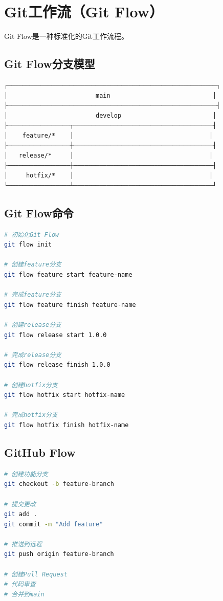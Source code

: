 \documentclass[12pt,UTF8]{ctexbook}
\begin{document}
\section{Git工作流（Git Flow）}
\label{sec:git-workflow}

Git Flow是一种标准化的Git工作流程。

\subsection*{Git Flow分支模型}
\begin{lstlisting}
┌─────────────────────────────────────────────────────────┐
│                        main                            │
├─────────────────────────────────────────────────────────┤
│                        develop                         │
├─────────────────┬──────────────────────────────────────┤
│    feature/*    │                                     │
├─────────────────┼──────────────────────────────────────┤
│   release/*     │                                     │
├─────────────────┼──────────────────────────────────────┤
│     hotfix/*    │                                     │
└─────────────────┴──────────────────────────────────────┘
\end{lstlisting}

\subsection*{Git Flow命令}
\begin{lstlisting}[language=bash]
# 初始化Git Flow
git flow init

# 创建feature分支
git flow feature start feature-name

# 完成feature分支
git flow feature finish feature-name

# 创建release分支
git flow release start 1.0.0

# 完成release分支
git flow release finish 1.0.0

# 创建hotfix分支
git flow hotfix start hotfix-name

# 完成hotfix分支
git flow hotfix finish hotfix-name
\end{lstlisting}

\subsection*{GitHub Flow}
\begin{lstlisting}[language=bash]
# 创建功能分支
git checkout -b feature-branch

# 提交更改
git add .
git commit -m "Add feature"

# 推送到远程
git push origin feature-branch

# 创建Pull Request
# 代码审查
# 合并到main
\end{lstlisting}
\end{document}
